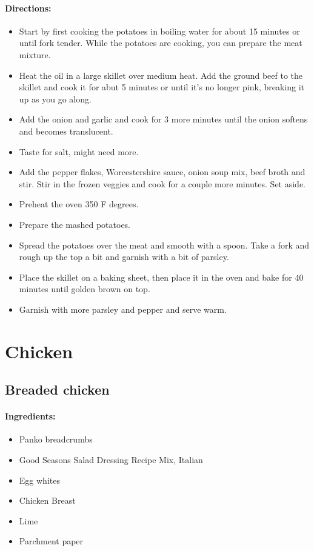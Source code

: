 \documentclass{article}
\begin{document}
\paragraph{Directions:}
\begin{itemize}
  \item Start by first cooking the potatoes in boiling water for about 15 minutes or until fork tender. While the
potatoes are cooking, you can prepare the meat mixture.
  \item Heat the oil in a large skillet over medium heat. Add the ground beef to the skillet and cook it for abut
5 minutes or until it’s no longer pink, breaking it up as you go along.
  \item Add the onion and garlic and cook for 3 more minutes until the onion softens and becomes translucent.
  \item Taste for salt, might need more.
  \item Add the pepper flakes, Worcestershire sauce, onion soup mix, beef broth and stir. Stir in the frozen
veggies and cook for a couple more minutes. Set aside.
  \item Preheat the oven 350 F degrees.
  \item Prepare the mashed potatoes.
  \item Spread the potatoes over the meat and smooth with a spoon. Take a fork and rough up the top a bit and
garnish with a bit of parsley.
  \item Place the skillet on a baking sheet, then place it in the oven and bake for 40 minutes until golden brown
on top.
  \item Garnish with more parsley and pepper and serve warm.
\end{itemize}


\section{Chicken}

\subsection{Breaded chicken}

\paragraph{Ingredients:}

\begin{itemize}
	\item Panko breadcrumbs
	\item Good Seasons Salad Dressing Recipe Mix, Italian
	\item Egg whites
	\item Chicken Breast
	\item Lime
	\item Parchment paper
\end{itemize}
\end{document}
